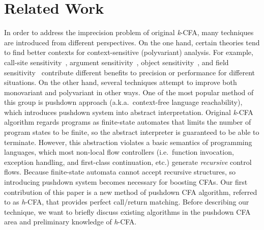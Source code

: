 \documentclass{article}
\begin{document}
\section{Related Work}
\label{sec:Related}
In order to address the imprecision problem of original \textit{k}-CFA, many techniques are introduced from different perspectives.
On the one hand, certain theories tend to find better contexts for context-sensitive (polyvariant) analysis.
For example, call-site sensitivity~\cite{shivers1991control}, argument sensitivity~\cite{agesen1995cartesian}, object sensitivity~\cite{milanova2005parameterized, smaragdakis2011pick}, and field sensitivity~\cite{lhotak2003scaling} contribute different benefits to precision or performance for different situations.
On the other hand, several techniques attempt to improve both monovariant and polyvariant in other ways.
One of the most popular method of this group is pushdown approach (a.k.a.\ context-free language reachability), which introduces pushdown system into abstract interpretation. %
Original \textit{k}-CFA algorithm regards programs as finite-state automates that limits the number of program states to be finite, so the abstract interpreter is guaranteed to be able to terminate.
However, this abstraction violates a basic semantics of programming languages, which most non-local flow controllers (i.e.\ function invocation, exception handling, and first-class continuation, etc.) generate \emph{recursive} control flows.
Because finite-state automata cannot accept recursive structures, so introducing pushdown system becomes necessary for boosting CFAs.
Our first contribution of this paper is a new method of pushdown CFA algorithm, referred to as \textit{h}-CFA, that provides perfect call/return matching.
Before describing our technique, we want to briefly discuss existing algorithms in the pushdown CFA area and preliminary knowledge of \textit{h}-CFA\@.
\end{document}
